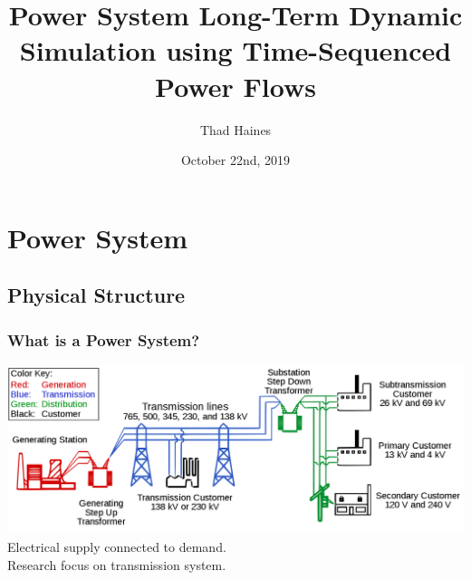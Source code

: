 \documentclass[14pt, unknownkeysallowed]{beamer}
\title{Power System Long-Term Dynamic Simulation using Time-Sequenced \\Power Flows}
\author{Thad Haines}
\institute[MT TECH]{Montana Technological University - Master's Thesis Research Project}
\date{October 22nd, 2019}
\begin{document}
	
\begin{frame}
	\titlepage
\end{frame}

\section{Power System}
\subsection{Physical Structure}
\begin{frame}
\frametitle{What is a Power System?}
\includegraphics[width=\linewidth]{largeGrid}{\tiny \cite{powersystemSVG} } %
Electrical supply connected to demand.\\ \vspace{.25em}
Research focus on transmission system.
\end{frame}
\end{document}
